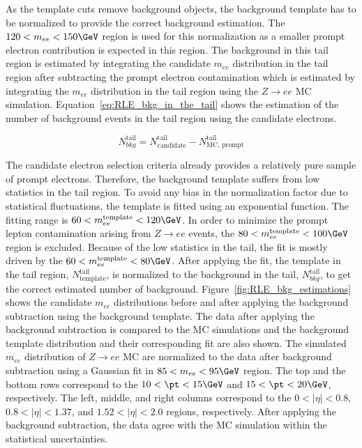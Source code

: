 As the template cuts remove background objects, the background template has to be normalized to provide the correct background estimation.
The $120<m_{ee}<150 \GeV$ region is used for this normalization as a smaller prompt electron contribution is expected in this region.
The background in this tail region is estimated by integrating the candidate $m_{ee}$ distribution in the tail region after subtracting the prompt electron contamination which is estimated by integrating the $m_{ee}$ distribution in the tail region using the $Z\to ee$ MC simulation.
Equation~\ref{eq:RLE_bkg_in_the_tail} shows the estimation of the number of background events in the tail region using the candidate electrons.

\begin{equation}
N_{bkg}^{\textrm{tail}} = N_{\textrm{candidate}}^{\textrm{tail}} - N_{\textrm{MC, prompt}}^{\textrm{tail}}
\label{eq:RLE_bkg_in_the_tail}
\end{equation}

The candidate electron selection criteria already provides a relatively pure sample of prompt electrons.
Therefore, the background template suffers from low statistics in the tail region.
To avoid any bias in the normalization factor due to statistical fluctuations, the template is fitted using an exponential function.
The fitting range is $60<m_{ee}^{\textrm{template}}<120 \GeV$.
In order to minimize the prompt lepton contamination arising from $Z\to ee$ events, the $80< m_{ee}^{\textrm{template}}<100 \GeV$ region is excluded.
Because of the low statistics in the tail, the fit is mostly driven by the $60< m_{ee}^{\textrm{template}}<80 \GeV$.
After applying the fit, the template in the tail region, $N_{\textrm{template}}^{\textrm{tail}}$, is normalized to the background in the tail, $N_{bkg}^{\textrm{tail}}$, to get the correct estimated number of background.
Figure~\ref{fig:RLE_bkg_estimations} shows the candidate $m_{ee}$ distributions before and after applying the background subtraction using the background template.
The data after applying the background subtraction is compared to the MC simulations and the background template distribution and their corresponding fit are also shown.
The simulated $m_{ee}$ distribution of $Z\to ee$ MC are normalized to the data after background subtraction using a Gaussian fit in $85<m_{ee}<95 \GeV$ region.
The top and the bottom rows correspond to the $10<\pt<15 \GeV$ and $15<\pt<20 \GeV$, respectively.
The left, middle, and right columns correspond to the $0<|\eta|<0.8$, $0.8<|\eta|<1.37$, and $1.52<|\eta|<2.0$ regions, respectively.
After applying the background subtraction, the data agree with the MC simulation within the statistical uncertainties.

